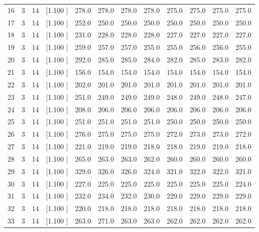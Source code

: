 \documentclass[12pt,a4paper]{article}
\begin{document}
\begin{center}
{\begin{tabular}{r r r r r r r r r r r r}
  16&  3& 14&[1.100     ]&   278.0&   278.0&   278.0&   278.0&   275.0&   275.0&   275.0&   275.0\\[-0.02in]
  17&  3& 14&[1.100     ]&   252.0&   250.0&   250.0&   250.0&   250.0&   250.0&   250.0&   250.0\\[-0.02in]
  18&  3& 14&[1.100     ]&   231.0&   228.0&   228.0&   228.0&   227.0&   227.0&   227.0&   227.0\\[-0.02in]
  19&  3& 14&[1.100     ]&   259.0&   257.0&   257.0&   255.0&   255.0&   256.0&   256.0&   255.0\\[-0.02in]
  20&  3& 14&[1.100     ]&   292.0&   285.0&   285.0&   284.0&   282.0&   285.0&   283.0&   282.0\\[-0.02in]
  21&  3& 14&[1.100     ]&   156.0&   154.0&   154.0&   154.0&   154.0&   154.0&   154.0&   154.0\\[-0.02in]
  22&  3& 14&[1.100     ]&   202.0&   201.0&   201.0&   201.0&   201.0&   201.0&   201.0&   201.0\\[-0.02in]
  23&  3& 14&[1.100     ]&   251.0&   249.0&   249.0&   249.0&   248.0&   249.0&   248.0&   247.0\\[-0.02in]
  24&  3& 14&[1.100     ]&   208.0&   206.0&   206.0&   206.0&   206.0&   206.0&   206.0&   206.0\\[-0.02in]
  25&  3& 14&[1.100     ]&   251.0&   251.0&   251.0&   251.0&   250.0&   250.0&   250.0&   250.0\\[-0.02in]
  26&  3& 14&[1.100     ]&   276.0&   275.0&   275.0&   275.0&   272.0&   273.0&   273.0&   272.0\\[-0.02in]
  27&  3& 14&[1.100     ]&   221.0&   219.0&   219.0&   218.0&   218.0&   219.0&   219.0&   218.0\\[-0.02in]
  28&  3& 14&[1.100     ]&   265.0&   263.0&   263.0&   262.0&   260.0&   260.0&   260.0&   260.0\\[-0.02in]
  29&  3& 14&[1.100     ]&   329.0&   326.0&   326.0&   324.0&   321.0&   322.0&   322.0&   321.0\\[-0.02in]
  30&  3& 14&[1.100     ]&   227.0&   225.0&   225.0&   225.0&   225.0&   225.0&   225.0&   224.0\\[-0.02in]
  31&  3& 14&[1.100     ]&   232.0&   234.0&   232.0&   230.0&   229.0&   229.0&   229.0&   229.0\\[-0.02in]
  32&  3& 14&[1.100     ]&   220.0&   218.0&   218.0&   218.0&   218.0&   218.0&   218.0&   218.0\\[-0.02in]
  33&  3& 14&[1.100     ]&   263.0&   271.0&   263.0&   263.0&   262.0&   262.0&   262.0&   262.0\\[-0.02in]

\end{tabular}}
\end{center}
\end{document}
